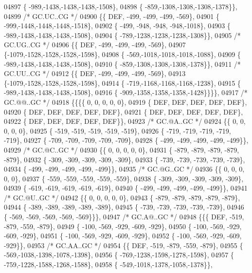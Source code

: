 \begin{DoxyCode}
04897 \{ -989,-1438,-1438,-1438,-1508\},
04898 \{ -859,-1308,-1308,-1308,-1378\}\},
04899 \textcolor{comment}{/* GC.UC..CG */}
04900 \{\{  DEF, -499, -499, -499, -569\},
04901 \{ -999,-1448,-1448,-1448,-1518\},
04902 \{ -499, -948, -948, -948,-1018\},
04903 \{ -989,-1438,-1438,-1438,-1508\},
04904 \{ -789,-1238,-1238,-1238,-1308\}\},
04905 \textcolor{comment}{/* GC.UG..CG */}
04906 \{\{  DEF, -499, -499, -499, -569\},
04907 \{-1079,-1528,-1528,-1528,-1598\},
04908 \{ -569,-1018,-1018,-1018,-1088\},
04909 \{ -989,-1438,-1438,-1438,-1508\},
04910 \{ -859,-1308,-1308,-1308,-1378\}\},
04911 \textcolor{comment}{/* GC.UU..CG */}
04912 \{\{  DEF, -499, -499, -499, -569\},
04913 \{-1079,-1528,-1528,-1528,-1598\},
04914 \{ -719,-1168,-1168,-1168,-1238\},
04915 \{ -989,-1438,-1438,-1438,-1508\},
04916 \{ -909,-1358,-1358,-1358,-1428\}\}\}\},
04917 \textcolor{comment}{/* GC.@@..GC */}
04918 \{\{\{\{    0,    0,    0,    0,    0\},
04919 \{  DEF,  DEF,  DEF,  DEF,  DEF\},
04920 \{  DEF,  DEF,  DEF,  DEF,  DEF\},
04921 \{  DEF,  DEF,  DEF,  DEF,  DEF\},
04922 \{  DEF,  DEF,  DEF,  DEF,  DEF\}\},
04923 \textcolor{comment}{/* GC.@A..GC */}
04924 \{\{    0,    0,    0,    0,    0\},
04925 \{ -519, -519, -519, -519, -519\},
04926 \{ -719, -719, -719, -719, -719\},
04927 \{ -709, -709, -709, -709, -709\},
04928 \{ -499, -499, -499, -499, -499\}\},
04929 \textcolor{comment}{/* GC.@C..GC */}
04930 \{\{    0,    0,    0,    0,    0\},
04931 \{ -879, -879, -879, -879, -879\},
04932 \{ -309, -309, -309, -309, -309\},
04933 \{ -739, -739, -739, -739, -739\},
04934 \{ -499, -499, -499, -499, -499\}\},
04935 \textcolor{comment}{/* GC.@G..GC */}
04936 \{\{    0,    0,    0,    0,    0\},
04937 \{ -559, -559, -559, -559, -559\},
04938 \{ -309, -309, -309, -309, -309\},
04939 \{ -619, -619, -619, -619, -619\},
04940 \{ -499, -499, -499, -499, -499\}\},
04941 \textcolor{comment}{/* GC.@U..GC */}
04942 \{\{    0,    0,    0,    0,    0\},
04943 \{ -879, -879, -879, -879, -879\},
04944 \{ -389, -389, -389, -389, -389\},
04945 \{ -739, -739, -739, -739, -739\},
04946 \{ -569, -569, -569, -569, -569\}\}\},
04947 \textcolor{comment}{/* GC.A@..GC */}
04948 \{\{\{  DEF, -519, -879, -559, -879\},
04949 \{ -100, -569, -929, -609, -929\},
04950 \{ -100, -569, -929, -609, -929\},
04951 \{ -100, -569, -929, -609, -929\},
04952 \{ -100, -569, -929, -609, -929\}\},
04953 \textcolor{comment}{/* GC.AA..GC */}
04954 \{\{  DEF, -519, -879, -559, -879\},
04955 \{ -569,-1038,-1398,-1078,-1398\},
04956 \{ -769,-1238,-1598,-1278,-1598\},
04957 \{ -759,-1228,-1588,-1268,-1588\},
04958 \{ -549,-1018,-1378,-1058,-1378\}\},

\end{DoxyCode}
